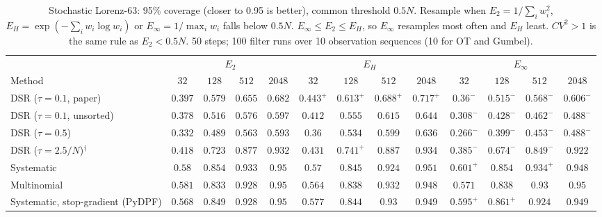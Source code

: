 \begin{table}[ht]
\centering
\small
\caption{Stochastic Lorenz-63: 95\% coverage (closer to 0.95 is better), common threshold $0.5N$. Resample when $E_2=1/\sum_iw_i^2$, $E_H=\exp(-\sum_iw_i\log w_i)$ or $E_\infty=1/\max_iw_i$ falls below $0.5N$. $E_\infty\le E_2\le E_H$, so $E_\infty$ resamples most often and $E_H$ least. $CV^2>1$ is the same rule as $E_2<0.5N$. 50 steps; 100 filter runs over 10 observation sequences (10 for OT and Gumbel).}
\label{tab:trigger-fixed-lorenz63-coverage95}
\begin{adjustbox}{max width=\linewidth}
\begin{tabular}{lcccc|cccc|cccc}
\toprule
 & \multicolumn{4}{c}{$E_2$} & \multicolumn{4}{c}{$E_H$} & \multicolumn{4}{c}{$E_\infty$} \\
\cmidrule(lr){2-5} \cmidrule(lr){6-9} \cmidrule(lr){10-13}
Method & $32$ & $128$ & $512$ & $2048$ & $32$ & $128$ & $512$ & $2048$ & $32$ & $128$ & $512$ & $2048$ \\
\midrule
DSR ($\tau{=}0.1$, paper) & $0.397$ & $0.579$ & $0.655$ & $0.682$ & $\mathbf{0.443}^{+}$ & $\mathbf{0.613}^{+}$ & $\mathbf{0.688}^{+}$ & $\mathbf{0.717}^{+}$ & $0.36^{-}$ & $0.515^{-}$ & $0.568^{-}$ & $0.606^{-}$ \\
DSR ($\tau{=}0.1$, unsorted) & $0.378$ & $0.516$ & $0.576$ & $0.597$ & $\mathbf{0.412}$ & $\mathbf{0.555}$ & $\mathbf{0.615}$ & $\mathbf{0.644}$ & $0.308^{-}$ & $0.428^{-}$ & $0.462^{-}$ & $0.488^{-}$ \\
DSR ($\tau{=}0.5$) & $0.332$ & $0.489$ & $0.563$ & $0.593$ & $\mathbf{0.36}$ & $\mathbf{0.534}$ & $\mathbf{0.599}$ & $\mathbf{0.636}$ & $0.266^{-}$ & $0.399^{-}$ & $0.453^{-}$ & $0.488^{-}$ \\
DSR ($\tau{=}2.5/N$)$^\dagger$ & $0.418$ & $0.723$ & $0.877$ & $0.932$ & $\mathbf{0.431}$ & $\mathbf{0.741}^{+}$ & $\mathbf{0.887}$ & $\mathbf{0.934}$ & $0.385^{-}$ & $0.674^{-}$ & $0.849^{-}$ & $0.922$ \\
\midrule
Systematic & $0.58$ & $0.854$ & $0.933$ & $\mathbf{0.95}$ & $0.57$ & $0.845$ & $0.924$ & $0.951$ & $\mathbf{0.601}^{+}$ & $\mathbf{0.854}$ & $\mathbf{0.934}^{+}$ & $0.948$ \\
Multinomial & $\mathbf{0.581}$ & $0.833$ & $0.928$ & $0.95$ & $0.564$ & $\mathbf{0.838}$ & $\mathbf{0.932}$ & $0.948$ & $0.571$ & $\mathbf{0.838}$ & $0.93$ & $\mathbf{0.95}$ \\
Systematic, stop-gradient (PyDPF) & $0.568$ & $0.849$ & $0.928$ & $\mathbf{0.95}$ & $0.577$ & $0.844$ & $\mathbf{0.93}$ & $0.949$ & $\mathbf{0.595}^{+}$ & $\mathbf{0.861}^{+}$ & $0.924$ & $0.949$ \\

\end{tabular}
\end{adjustbox}
\end{table}
